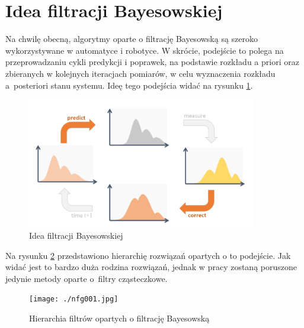 \section{Idea filtracji Bayesowskiej}
Na chwilę obecną, algorytmy oparte o filtrację Bayesowską są szeroko wykorzystywane w automatyce i robotyce. W skrócie, podejście to polega na przeprowadzaniu cykli predykcji i poprawek, na podstawie rozkładu a priori oraz zbieranych w kolejnych iteracjach pomiarów, w celu wyznaczenia rozkładu a~posteriori stanu systemu. Ideę tego podejścia widać na rysunku \ref{bayes_fil_idea}. 
\begin{figure}[H]
	\begin{center}
		\includegraphics[width=10cm]{./predict_update.png}
		\caption[Idea filtracji Bayesowskiej]{Idea filtracji Bayesowskiej \cite{main_idea}}
		\label{bayes_fil_idea}
	\end{center}
\end{figure}
Na rysunku \ref{filtr_hier} przedstawiono hierarchię rozwiązań opartych o to podejście. Jak widać jest to bardzo duża rodzina rozwiązań, jednak w pracy zostaną poruszone jedynie metody oparte o~filtry cząsteczkowe.
\begin{figure}[H]
	\begin{center}
		\texttt{[image: ./nfg001.jpg]}
		\caption[Hierarchia filtrów opartych o filtrację Bayesowską]{Hierarchia filtrów opartych o filtrację Bayesowską \cite{prac_gui}} \label{filtr_hier}
	\end{center}
\end{figure}
